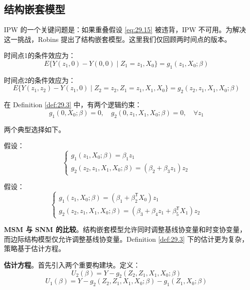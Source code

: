 \subsection{结构嵌套模型}\label{sec:29-5-2}

IPW 的一个关键问题是：如果重叠假设 \ref{eq:29.15} 被违背，IPW 不可用。为解决这一挑战，Robins 提出了结构嵌套模型。这里我们仅回顾两时间点的版本。

\begin{Definition}\label{def:29.3}
时间点1的条件效应为：
\[
E\{Y(z_1, 0) - Y(0, 0) \mid Z_1 = z_1, X_0\} = g_1(z_1, X_0; \beta)
\tag{29.23}
\]

时间点2的条件效应为：
\[
E\{Y(z_1, z_2) - Y(z_1, 0) \mid Z_2 = z_2, Z_1 = z_1, X_1, X_0\} = g_2(z_2, z_1, X_1, X_0; \beta)
\tag{29.24}
\]
\end{Definition}

在 Definition \ref{def:29.3} 中，有两个逻辑约束：
\[
g_1(0, X_0; \beta) = 0, \quad g_2(0, z_1, X_1, X_0; \beta) = 0, \quad \forall z_1
\tag{29.25}
\]

两个典型选择如下。

\begin{Example}\label{ex:29.2}
假设：
\[
\begin{cases}
g_1(z_1, X_0; \beta) = \beta_1 z_1 \\
g_2(z_2, z_1, X_1, X_0; \beta) = (\beta_2 + \beta_3 z_1) z_2
\end{cases}
\tag{29.26}
\]
\end{Example}

\begin{Example}\label{ex:29.3}
假设：
\[
\begin{cases}
g_1(z_1, X_0; \beta) = (\beta_1 + \beta_2^{\mathsf{T}} X_0) z_1 \\
g_2(z_2, z_1, X_1, X_0; \beta) = (\beta_3 + \beta_4 z_1 + \beta_5^{\mathsf{T}} X_1) z_2
\end{cases}
\tag{29.27}
\]
\end{Example}

\textbf{MSM 与 SNM 的比较}。结构嵌套模型允许同时调整基线协变量和时变协变量，而边际结构模型仅允许调整基线协变量。Definition \ref{def:29.3} 下的估计更为复杂，策略基于估计方程。

\textbf{估计方程}。首先引入两个重要构建块。定义：
\[
U_2(\beta) = Y - g_2(Z_2, Z_1, X_1, X_0; \beta)
\tag{29.28}
\]
\[
U_1(\beta) = Y - g_2(Z_2, Z_1, X_1, X_0; \beta) - g_1(Z_1, X_0; \beta)
\tag{29.29}
\]

